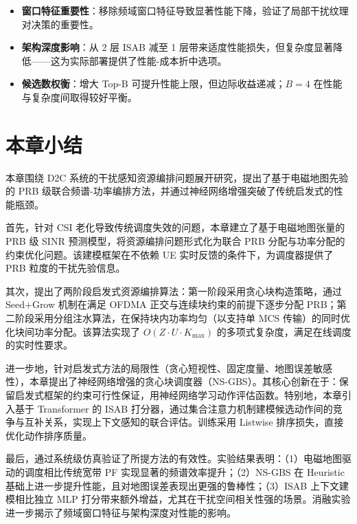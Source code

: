 \documentclass[type=master]{fduthesis}
\begin{document}
\begin{itemize}
\item \textbf{窗口特征重要性}：移除频域窗口特征导致显著性能下降，验证了局部干扰纹理对决策的重要性。

\item \textbf{架构深度影响}：从 2 层 ISAB 减至 1 层带来适度性能损失，但复杂度显著降低——这为实际部署提供了性能-成本折中选项。

\item \textbf{候选数权衡}：增大 Top-B 可提升性能上限，但边际收益递减；$B = 4$ 在性能与复杂度间取得较好平衡。
\end{itemize}

\section{本章小结}
\label{sec:ch4_summary}

本章围绕 D2C 系统的干扰感知资源编排问题展开研究，提出了基于电磁地图先验的 PRB 级联合频谱-功率编排方法，并通过神经网络增强突破了传统启发式的性能瓶颈。

首先，针对 CSI 老化导致传统调度失效的问题，本章建立了基于电磁地图张量的 PRB 级 SINR 预测模型，将资源编排问题形式化为联合 PRB 分配与功率分配的约束优化问题。该建模框架在不依赖 UE 实时反馈的条件下，为调度器提供了 PRB 粒度的干扰先验信息。

其次，提出了两阶段启发式资源编排算法：第一阶段采用贪心块构造策略，通过 Seed+Grow 机制在满足 OFDMA 正交与连续块约束的前提下逐步分配 PRB；第二阶段采用分组注水算法，在保持块内功率均匀（以支持单 MCS 传输）的同时优化块间功率分配。该算法实现了 $O(Z \cdot U \cdot K_{\max})$ 的多项式复杂度，满足在线调度的实时性要求。

进一步地，针对启发式方法的局限性（贪心短视性、固定度量、地图误差敏感性），本章提出了神经网络增强的贪心块调度器（NS-GBS）。其核心创新在于：保留启发式框架的约束可行性保证，用神经网络学习动作评估函数。特别地，本章引入基于 Transformer 的 ISAB 打分器，通过集合注意力机制建模候选动作间的竞争与互补关系，实现上下文感知的联合评估。训练采用 Listwise 排序损失，直接优化动作排序质量。

最后，通过系统级仿真验证了所提方法的有效性。实验结果表明：（1）电磁地图驱动的调度相比传统宽带 PF 实现显著的频谱效率提升；（2）NS-GBS 在 Heuristic 基础上进一步提升性能，且对地图误差表现出更强的鲁棒性；（3）ISAB 上下文建模相比独立 MLP 打分带来额外增益，尤其在干扰空间相关性强的场景。消融实验进一步揭示了频域窗口特征与架构深度对性能的影响。
\end{document}
